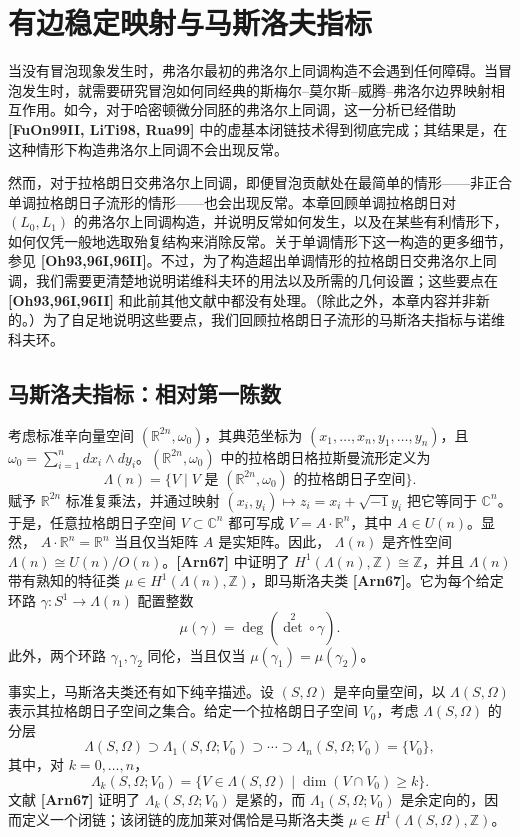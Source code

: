 
\section{有边稳定映射与马斯洛夫指标}
\label{sec:2-1}

当没有冒泡现象发生时，弗洛尔最初的弗洛尔上同调构造不会遇到任何障碍。当冒泡发生时，就需要研究冒泡如何同经典的斯梅尔--莫尔斯--威腾--弗洛尔边界映射相互作用。如今，对于哈密顿微分同胚的弗洛尔上同调，这一分析已经借助 \textbf{[FuOn99II, LiTi98, Rua99]} 中的虚基本闭链技术得到彻底完成；其结果是，在这种情形下构造弗洛尔上同调不会出现反常。

然而，对于拉格朗日交弗洛尔上同调，即便冒泡贡献处在最简单的情形——非正合单调拉格朗日子流形的情形——也会出现反常。本章回顾单调拉格朗日对 $(L_0,L_1)$ 的弗洛尔上同调构造，并说明反常如何发生，以及在某些有利情形下，如何仅凭一般地选取殆复结构来消除反常。关于单调情形下这一构造的更多细节，参见 \textbf{[Oh93,96I,96II]}。不过，为了构造超出单调情形的拉格朗日交弗洛尔上同调，我们需要更清楚地说明诺维科夫环的用法以及所需的几何设置；这些要点在 \textbf{[Oh93,96I,96II]} 和此前其他文献中都没有处理。（除此之外，本章内容并非新的。）为了自足地说明这些要点，我们回顾拉格朗日子流形的马斯洛夫指标与诺维科夫环。

\subsection{马斯洛夫指标：相对第一陈数}
\label{sec:2-1-1}

考虑标准辛向量空间 $(\mathbb R^{2n},\omega_0)$，其典范坐标为
$(x_1,\ldots,x_n,y_1,\ldots,y_n)$，且
$\omega_0=\sum_{i=1}^n dx_i\wedge dy_i$。$(\mathbb R^{2n},\omega_0)$ 中的拉格朗日格拉斯曼流形定义为
\[
  \Lambda(n)
  =\{V\mid V\text{ 是 }(\mathbb R^{2n},\omega_0)
      \text{ 的拉格朗日子空间}\}.
\]
赋予 $\mathbb R^{2n}$ 标准复乘法，并通过映射
$(x_i,y_i)\mapsto z_i=x_i+\sqrt{-1}y_i$ 把它等同于 $\mathbb C^n$。于是，任意拉格朗日子空间 $V\subset\mathbb C^n$ 都可写成
$V=A\cdot\mathbb R^n$，其中 $A\in U(n)$。显然，
$A\cdot\mathbb R^n=\mathbb R^n$ 当且仅当矩阵 $A$ 是实矩阵。因此，
$\Lambda(n)$ 是齐性空间
$\Lambda(n)\cong U(n)/O(n)$。\textbf{[Arn67]} 中证明了
$H^1(\Lambda(n),\mathbb Z)\cong\mathbb Z$，并且 $\Lambda(n)$ 带有熟知的特征类
$\mu\in H^1(\Lambda(n),\mathbb Z)$，即马斯洛夫类 \textbf{[Arn67]}。它为每个给定环路
$\gamma:S^1\to\Lambda(n)$ 配置整数
\[
  \mu(\gamma)=\deg(\det^2\circ\gamma).
\]
此外，两个环路 $\gamma_1,\gamma_2$ 同伦，当且仅当
$\mu(\gamma_1)=\mu(\gamma_2)$。

事实上，马斯洛夫类还有如下纯辛描述。设 $(S,\Omega)$ 是辛向量空间，以
$\Lambda(S,\Omega)$ 表示其拉格朗日子空间之集合。给定一个拉格朗日子空间
$V_0$，考虑 $\Lambda(S,\Omega)$ 的分层
\[
  \Lambda(S,\Omega)
  \supset\Lambda_1(S,\Omega;V_0)
  \supset\cdots\supset
  \Lambda_n(S,\Omega;V_0)=\{V_0\},
\]
其中，对 $k=0,\ldots,n$，
\[
  \Lambda_k(S,\Omega;V_0)
  =\{V\in\Lambda(S,\Omega)\mid\dim(V\cap V_0)\geq k\}.
\]
文献 \textbf{[Arn67]} 证明了 $\Lambda_k(S,\Omega;V_0)$ 是紧的，而
$\Lambda_1(S,\Omega;V_0)$ 是余定向的，因而定义一个闭链；该闭链的庞加莱对偶恰是马斯洛夫类
$\mu\in H^1(\Lambda(S,\Omega),\mathbb Z)$。

